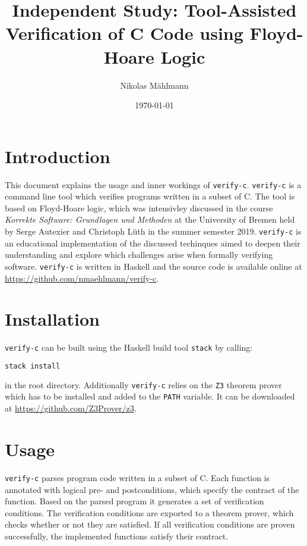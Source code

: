 \documentclass[12pt]{article}
\begin{document}
\setlength{\parindent}{0pt}
\newcommand{\verifyc}[0]{\texttt{verify-c}\xspace}
\newcommand{\zthree}[0]{\texttt{Z3}\xspace}

\title{Independent Study: Tool-Assisted Verification of C Code using Floyd-Hoare Logic}
\author{Nikolas Mählmann}
\date{\today}

\maketitle

\section{Introduction}
This document explains the usage and inner workings of \verifyc. 
\verifyc is a command line tool which verifies programs written in a subset of C. 
The tool is based on Floyd-Hoare logic, which was intensivley discussed in the course \emph{Korrekte Software: Grundlagen und Methoden} at the University of Bremen held by Serge Autexier and Christoph Lüth in the summer semester 2019. \verifyc is an educational implementation of the discussed techinques aimed to deepen their understanding and explore which challenges arise when formally verifying software. 
\verifyc is written in Haskell and the source code is available online at \url{https://github.com/nmaehlmann/verify-c}.

\section{Installation}
\verifyc can be built using the Haskell build tool \texttt{stack} by calling:

\begin{lstlisting}[language=bash]
stack install
\end{lstlisting}

in the root directory.
Additionally \verifyc relies on the \zthree theorem prover which has to be installed and added to the \texttt{PATH} variable.
It can be downloaded at \url{https://github.com/Z3Prover/z3}.
  

\section{Usage}
\label{usage}
\verifyc parses program code written in a subset of C.
Each function is annotated with logical pre- and postconditions, which specify the contract of the function.
Based on the parsed program it generates a set of verification conditions.
The verification conditions are exported to a theorem prover, which checks whether or not they are satisfied.
If all verification conditions are proven successfully, the implemented functions satisfy their contract.
\end{document}
